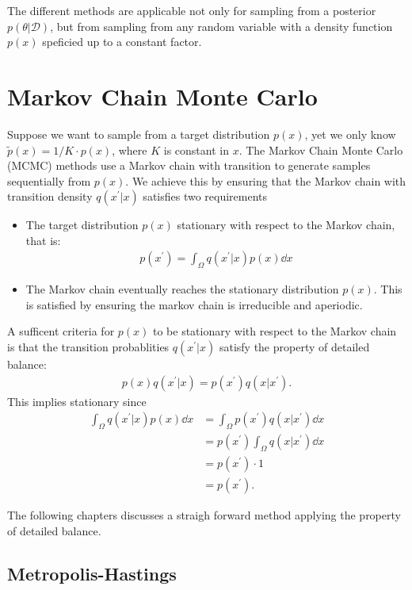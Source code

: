 The different methods are applicable not only for sampling from a posterior $p(\theta | \mathcal{D})$, but from sampling from any random variable with a density function $p(x)$ speficied up to a constant factor.

\section{Markov Chain Monte Carlo}
Suppose we want to sample from a target distribution $p(x)$, yet we only know $\tilde{p}(x) = 1/K\cdot p(x)$, where $K$ is constant in $x$.
The Markov Chain Monte Carlo (MCMC) methods use a Markov chain with transition to generate samples sequentially from $p(x)$. 
We achieve this by ensuring that the Markov chain with transition density $q(x^\prime | x)$ satisfies two requirements
\begin{itemize}
    \item The target distribution $p(x)$ stationary with respect to the Markov chain, that is:
    \begin{align} \label{eq:stationarity}
        p(x^\prime) = \int_{\Omega} q(x^\prime| x) p(x) \dd{x} 
    \end{align}
    \item The Markov chain eventually reaches the stationary distribution $p(x)$. This is satisfied by ensuring the markov chain is irreducible and aperiodic.
\end{itemize}
A sufficent criteria for $p(x)$ to be stationary with respect to the Markov chain is that the transition probablities $q(x^\prime|x)$ satisfy the property of detailed balance:
\begin{align*}
    p(x)q(x^\prime | x) = p(x^\prime)q(x| x^\prime).
\end{align*}
This implies stationary since
\begin{align*}
    \int_{\Omega} q(x^\prime | x) p(x) \dd{x} 
    &= \int_{\Omega}  p(x^\prime)q(x| x^\prime) \dd{x} \\ 
    &=  p(x^\prime) \int_{\Omega} q(x| x^\prime) \dd{x} \\
    &=  p(x^\prime) \cdot 1 \\
    &= p(x^\prime).
\end{align*}

The following chapters discusses a straigh forward method applying the property of detailed balance.

\subsection{Metropolis-Hastings}

